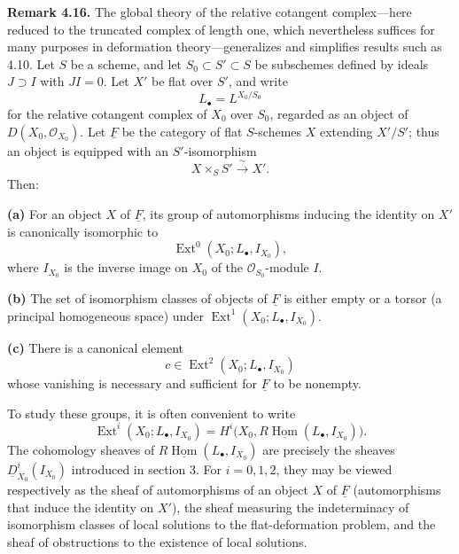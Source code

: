 \medskip
\noindent\textbf{Remark 4.16.}
The global theory of the relative cotangent complex---here reduced to
the truncated complex of length one, which nevertheless suffices for
many purposes in deformation theory---generalizes and simplifies
results such as 4.10. Let $S$ be a scheme, and let
$S_0\subset S'\subset S$ be subschemes defined by ideals
$J\supset I$ with $JI=0$. Let $X'$ be flat over $S'$, and write
\[
L_\bullet=L^{X_0/S_0}
\]
for the relative cotangent complex of $X_0$ over $S_0$, regarded as
an object of $D(X_0,\mathcal O_{X_0})$. Let $\underline F$ be the
category of flat $S$-schemes $X$ extending $X'/S'$; thus an object is
equipped with an $S'$-isomorphism
\[
X\times_SS'\xrightarrow{\ \sim\ }X'.
\]
Then:

\smallskip
\noindent\textbf{(a)} For an object $X$ of $\underline F$, its group
of automorphisms inducing the identity on $X'$ is canonically
isomorphic to
\[
\operatorname{Ext}^0(X_0;L_\bullet,I_{X_0}),
\]
where $I_{X_0}$ is the inverse image on $X_0$ of the
$\mathcal O_{S_0}$-module $I$.


\smallskip
\noindent\textbf{(b)} The set of isomorphism classes of objects of
$\underline F$ is either empty or a torsor (a principal homogeneous
space) under
$\operatorname{Ext}^1(X_0;L_\bullet,I_{X_0})$.

\smallskip
\noindent\textbf{(c)} There is a canonical element
\[
c\in\operatorname{Ext}^2(X_0;L_\bullet,I_{X_0})
\]
whose vanishing is necessary and sufficient for $\underline F$ to be
nonempty.

To study these groups, it is often convenient to write
\[
\operatorname{Ext}^i(X_0;L_\bullet,I_{X_0})
=H^i\bigl(X_0,R\underline{\operatorname{Hom}}
  (L_\bullet,I_{X_0})\bigr).
\]
The cohomology sheaves of
$R\underline{\operatorname{Hom}}(L_\bullet,I_{X_0})$ are precisely
the sheaves $\underline D^i_{X_0}(I_{X_0})$ introduced in section 3.
For $i=0,1,2$, they may be viewed respectively as the sheaf of
automorphisms of an object $X$ of $\underline F$ (automorphisms that
induce the identity on $X'$), the sheaf measuring the indeterminacy
of isomorphism classes of local solutions to the flat-deformation
problem, and the sheaf of obstructions to the existence of local
solutions.

